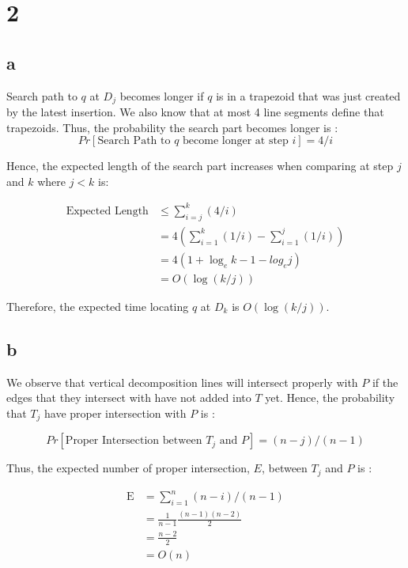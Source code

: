 
\section*{2}
\subsection*{a}
Search path to $q$ at $D_j$ becomes longer if $q$ is in a trapezoid that was just
created by the latest insertion. We also know that at most 4 line segments define
that trapezoids. Thus, the probability the search part becomes longer is :
$$
Pr[\text{Search Path to $q$ become longer at step $i$}] = 4/i
$$

Hence, the expected length of the search part increases when comparing at step $j$ and $k$
where $j<k$ is:

\begin{align*}
    \text{Expected Length} &\leq \sum_{i=j}^{k}( 4/i ) \\
    &= 4( \sum_{i=1}^{k}( 1/i ) -  \sum_{i=1}^{j}( 1/i ) ) \\
    &= 4( 1 + \log_{e}k - 1 - log_{e}j ) \\
    &= O(\log(k/j))
\end{align*}

Therefore, the expected time locating $q$ at $D_k$ is $O(\log(k/j))$.

\subsection*{b}
We observe that vertical decomposition lines will intersect properly with $P$ if 
the edges that they intersect with have not added into $T$ yet. Hence,
the probability that $T_j$ have proper intersection with $P$ is :

$$
Pr[\text{Proper Intersection between $T_j$ and $P$} ] = (n-j)/(n-1)
$$

Thus, the expected number of proper intersection, $E$, between $T_j$ and $P$ is :

\begin{align*}
    \text{E} &= \sum_{i=1}^{n}(n-i)/(n-1) \\
    &= \frac{1}{n-1}\frac{(n-1)(n-2)}{2} \\
    &= \frac{n-2}{2} \\
    &= O(n)
\end{align*}
